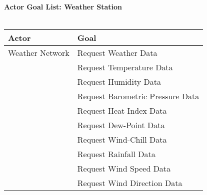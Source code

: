 \documentclass[letterpaper]{article}
\begin{document}
\noindent
\textbf{Actor Goal List:  Weather Station}\\\\
\vspace{4ex}
\begin{tabular}{|l|l|}\hline
\textbf{Actor} & \textbf{Goal}\\\hline
Weather Network & Request Weather Data\\\hline
& Request Temperature Data\\\hline
& Request Humidity Data\\\hline
& Request Barometric Pressure Data\\\hline
& Request Heat Index Data\\\hline
& Request Dew-Point Data\\\hline
& Request Wind-Chill Data\\\hline
& Request Rainfall Data\\\hline
& Request Wind Speed Data\\\hline
& Request Wind Direction Data\\\hline
\end{tabular}\\
\end{document}
